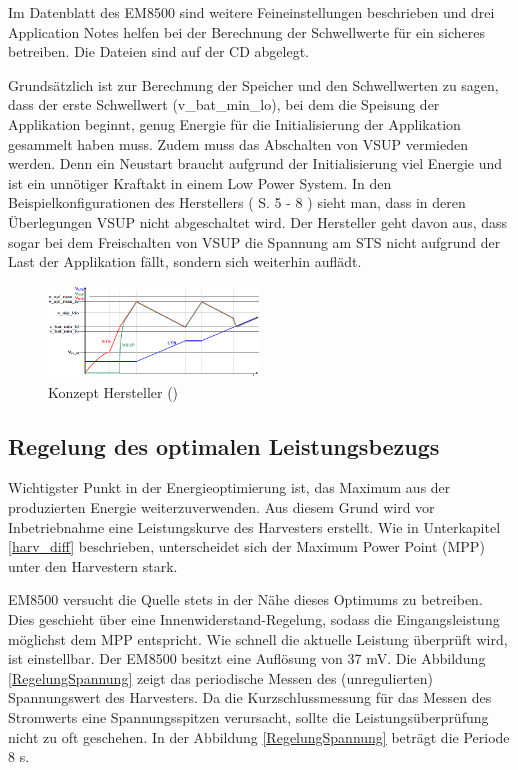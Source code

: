 Im Datenblatt des EM8500 \cite{datasheet_EM85} sind weitere Feineinstellungen beschrieben und drei Application Notes helfen bei der Berechnung der Schwellwerte für ein sicheres betreiben. Die Dateien sind auf der CD abgelegt.

Grundsätzlich ist zur Berechnung der Speicher und den Schwellwerten zu sagen, dass der erste Schwellwert (v\_bat\_min\_lo), bei dem die Speisung der Applikation beginnt, genug Energie für die Initialisierung der Applikation gesammelt haben muss. Zudem muss das Abschalten von VSUP vermieden werden. Denn ein Neustart braucht aufgrund der Initialisierung viel Energie und ist ein unnötiger Kraftakt in einem Low Power System. In den Beispielkonfigurationen des Herstellers (\cite{datasheet_EM85} S. 5 - 8 ) sieht man, dass in deren Überlegungen VSUP nicht abgeschaltet wird. Der Hersteller geht davon aus, dass sogar bei dem Freischalten von VSUP die Spannung am STS nicht aufgrund der Last der Applikation fällt, sondern sich weiterhin auflädt.

\begin{figure}[ht]
   \includegraphics[width=0.5\textwidth]{2TheoretischeGrundlagen/imag/KonzeptFirma.png}
   \caption{Konzept Hersteller (\cite{datasheet_EM85})}
   \label{energiespeisung_lts} 
\end{figure}


\subsection{Regelung des optimalen Leistungsbezugs}

Wichtigster Punkt in der Energieoptimierung ist, das Maximum aus der produzierten Energie weiterzuverwenden. Aus diesem Grund wird vor Inbetriebnahme eine Leistungskurve des Harvesters erstellt. Wie in Unterkapitel \ref{harv_diff} beschrieben, unterscheidet sich der Maximum Power Point (MPP) unter den Harvestern stark.

EM8500 versucht die Quelle stets in der Nähe dieses Optimums zu betreiben. Dies geschieht über eine Innenwiderstand-Regelung, sodass die Eingangsleistung möglichst dem MPP entspricht. Wie schnell die aktuelle Leistung überprüft wird, ist einstellbar. Der EM8500 besitzt eine Auflösung von 37 mV. Die Abbildung \ref{RegelungSpannung} zeigt das periodische Messen des (unregulierten) Spannungswert des Harvesters. Da die Kurzschlussmessung für das Messen des Stromwerts eine Spannungsspitzen verursacht, sollte die Leistungsüberprüfung nicht zu oft geschehen. In der Abbildung \ref{RegelungSpannung} beträgt die Periode 8 s.

